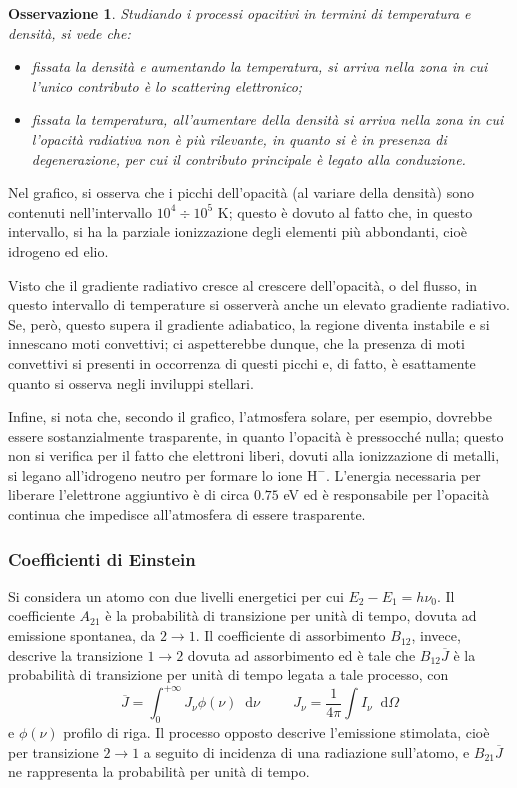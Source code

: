 \documentclass[11pt, a4paper]{scrartcl}
\theoremstyle{style}
\newtheorem{osservazione}{Osservazione}[section]
\theoremstyle{style1}
\newcommand{\dd}{\mathop{}\!\mathrm{d}}
\numberwithin{equation}{subsection}
\begin{document}
\begin{osservazione}
Studiando i processi opacitivi in termini di temperatura e densit\`a, si vede che:
\begin{itemize}
	\item fissata la densit\`a e aumentando la temperatura, si arriva nella zona in cui l'unico contributo \`e lo scattering elettronico;
	\item fissata la temperatura, all'aumentare della densit\`a si arriva nella zona in cui l'opacit\`a radiativa non \`e pi\`u rilevante, in quanto si \`e in presenza di degenerazione, per cui il contributo principale \`e legato alla conduzione.
\end{itemize}
\end{osservazione}
\noindent Nel grafico, si osserva che i picchi dell'opacit\`a (al variare della densit\`a) sono contenuti nell'intervallo $10^4 \div 10^5$ K; questo \`e dovuto al fatto che, in questo intervallo, si ha la parziale ionizzazione degli elementi pi\`u abbondanti, cio\`e idrogeno ed elio.	

Visto che il gradiente radiativo cresce al crescere dell'opacit\`a, o del flusso, in questo intervallo di temperature si osserver\`a anche un elevato gradiente radiativo.
Se, per\`o, questo supera il gradiente adiabatico, la regione diventa instabile e si innescano moti convettivi; ci aspetterebbe dunque, che la presenza di moti convettivi si presenti in occorrenza di questi picchi e, di fatto, \`e esattamente quanto si osserva negli inviluppi stellari.

Infine, si nota che, secondo il grafico, l'atmosfera solare, per esempio, dovrebbe essere sostanzialmente trasparente, in quanto l'opacit\`a \`e pressocch\'e nulla; questo non si verifica per il fatto che elettroni liberi, dovuti alla ionizzazione di metalli, si legano all'idrogeno neutro per formare lo ione $\mathrm{H} ^-$.
L'energia necessaria per liberare l'elettrone aggiuntivo \`e di circa $0.75$ eV ed \`e responsabile per l'opacit\`a continua che impedisce all'atmosfera di essere trasparente.
\subsubsection{Coefficienti di Einstein}

Si considera un atomo con due livelli energetici per cui $E_2 - E_1 = h\nu _0$.
Il coefficiente $A_{21}$ \`e la probabilit\`a di transizione per unit\`a di tempo, dovuta ad emissione spontanea, da $2\to 1$.
Il coefficiente di assorbimento $B_{12}$, invece, descrive la transizione $1\to 2$ dovuta ad assorbimento ed \`e tale che $B_{12} \overline{J}$ \`e la probabilit\`a di transizione per unit\`a di tempo legata a tale processo, con
\[
\overline{J } = \int_0 ^{+\infty} J_\nu  \phi (\nu ) \dd \nu \hspace{1cm} J_\nu = \frac{1}{4\pi} \int I_\nu \dd \Omega 
\] 
e $\phi (\nu )$ profilo di riga.
Il processo opposto descrive l'emissione stimolata, cio\`e per transizione $2\to 1$ a seguito di incidenza di una radiazione sull'atomo, e $B_{21}\overline{J}$ ne rappresenta la probabilit\`a per unit\`a di tempo.
\end{document}

